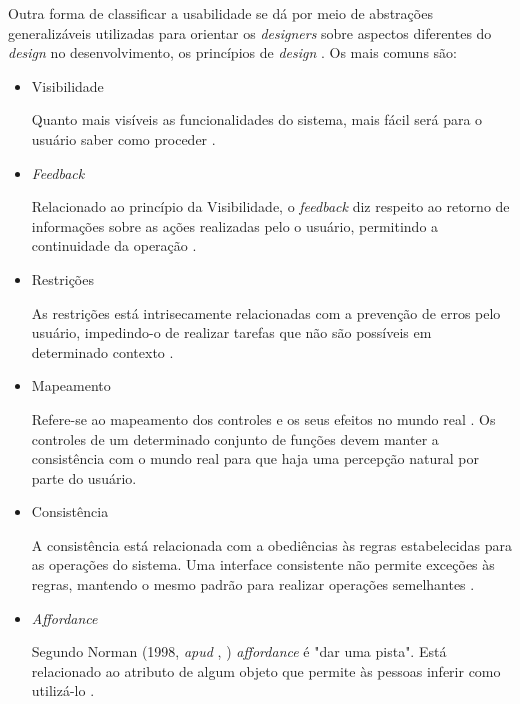     Outra forma de classificar a usabilidade se dá por meio de abstrações generalizáveis utilizadas para orientar os \textit{designers}
    sobre aspectos diferentes do \textit{design} no desenvolvimento, os princípios de \textit{design} \cite{preece}. Os mais comuns são:
    
    \begin{itemize}
     \item Visibilidade
	
	\subitem Quanto mais visíveis as funcionalidades do sistema, mais fácil será para o usuário saber como proceder \cite{preece}.
      
     \item \textit{Feedback}
	
	\subitem Relacionado ao princípio da Visibilidade, o \textit{feedback} diz respeito ao retorno de informações sobre as
	  ações realizadas pelo o usuário, permitindo a continuidade da operação \cite{preece}.
     
     \item Restrições
     
	\subitem As restrições está intrisecamente relacionadas com a prevenção de erros pelo usuário, impedindo-o de realizar 
	  tarefas que não são possíveis em determinado contexto \cite{preece}.

     \item Mapeamento
	
	\subitem Refere-se ao mapeamento dos controles e os seus efeitos no mundo real \cite{preece}.
	  Os controles de um determinado conjunto de funções devem manter a consistência com o mundo real para que haja uma
	  percepção natural por parte do usuário.
	
     \item Consistência
	
	\subitem A consistência está relacionada com a obediências às regras estabelecidas para as operações do sistema. 
	  Uma interface consistente não permite exceções às regras, mantendo o mesmo padrão para realizar operações
	  semelhantes \cite{preece}.
	
     \item \textit{Affordance}
	
	\subitem Segundo Norman (1998, \textit{apud} \citeauthor{preece}, \citeyear{preece}) \textit{affordance} é "dar uma pista".
	  Está relacionado ao atributo de algum objeto que permite às pessoas inferir como utilizá-lo \cite{preece}.
	  
    \end{itemize}
    
